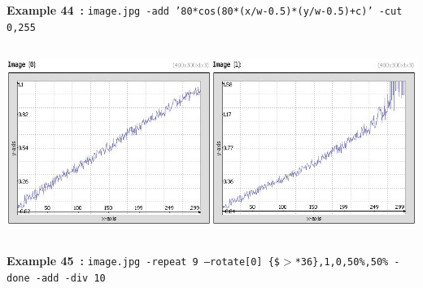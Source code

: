\documentclass[a4paper,11pt,twoside]{book}
\begin{document}
\begin{center}
{\footnotesize \textbf{Example 44~:} \texttt{image.jpg -add '80*cos(80*(x/w-0.5)*(y/w-0.5)+c)' -cut 0,255}}
\\\includegraphics[keepaspectratio=true,height=7cm,width=\textwidth]{img/gmic_def45.jpg}\\
{\footnotesize \textbf{Example 45~:} \texttt{image.jpg -repeat 9 --rotate[0] \{\$$>$*36\},1,0,50\%,50\% -done -add -div 10}}
\end{center}
\end{document}
